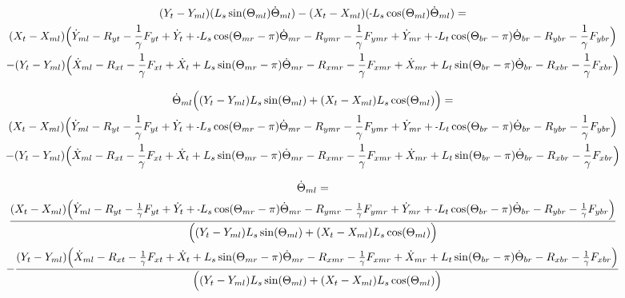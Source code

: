 \documentclass[11pt, landscape]{article}
\newcommand{\mn}{\scalebox{0.7}[1.0]{-}}
\begin{document}
\begin{multline}
(Y_{t } - Y_{ml})(L_{s}\sin(\Theta_{ml}) \dot{\Theta}_{ml}) - (X_{t } - X_{ml})(\mn L_{s}\cos(\Theta_{ml}) \dot{\Theta}_{ml}) = \\
(X_{t } - X_{ml}) \Big( \dot{Y}_{ml} - R_{yt} - \frac{1}{\gamma}F_{yt } + \dot{Y}_{t } + \mn L_{s}\cos(\Theta_{mr}-\pi)  \dot{\Theta}_{mr}
- R_{ymr} - \frac{1}{\gamma}F_{ymr} + \dot{Y}_{mr} + \mn L_{t}\cos(\Theta_{br}-\pi)  \dot{\Theta}_{br} - R_{ybr} - \frac{1}{\gamma}F_{ybr}\Big) \\
- (Y_{t } - Y_{ml})\Big( \dot{X}_{ml} - R_{xt } - \frac{1}{\gamma}F_{xt } + \dot{X}_{t } + L_{s}\sin(\Theta_{mr}-\pi)  \dot{\Theta}_{mr}
- R_{xmr} - \frac{1}{\gamma}F_{xmr} + \dot{X}_{mr} + L_{t}\sin(\Theta_{br}-\pi)  \dot{\Theta}_{br} - R_{xbr} - \frac{1}{\gamma}F_{xbr} \Big)
\end{multline}

\begin{multline}
\dot{\Theta}_{ml} \Big((Y_{t } - Y_{ml})L_{s}\sin(\Theta_{ml}) + (X_{t } - X_{ml})L_{s}\cos(\Theta_{ml}) \Big) = \\
(X_{t } - X_{ml}) \Big( \dot{Y}_{ml} - R_{yt} - \frac{1}{\gamma}F_{yt } + \dot{Y}_{t } + \mn L_{s}\cos(\Theta_{mr}-\pi)  \dot{\Theta}_{mr}
- R_{ymr} - \frac{1}{\gamma}F_{ymr} + \dot{Y}_{mr} + \mn L_{t}\cos(\Theta_{br}-\pi)  \dot{\Theta}_{br} - R_{ybr} - \frac{1}{\gamma}F_{ybr}\Big) \\
- (Y_{t } - Y_{ml})\Big( \dot{X}_{ml} - R_{xt } - \frac{1}{\gamma}F_{xt } + \dot{X}_{t } + L_{s}\sin(\Theta_{mr}-\pi)  \dot{\Theta}_{mr}
- R_{xmr} - \frac{1}{\gamma}F_{xmr} + \dot{X}_{mr} + L_{t}\sin(\Theta_{br}-\pi)  \dot{\Theta}_{br} - R_{xbr} - \frac{1}{\gamma}F_{xbr} \Big)
\end{multline}

\begin{multline}
\dot{\Theta}_{ml} = \\
\frac{(X_{t } - X_{ml}) \Big( \dot{Y}_{ml} - R_{yt} - \frac{1}{\gamma}F_{yt } + \dot{Y}_{t } + \mn L_{s}\cos(\Theta_{mr}-\pi)  \dot{\Theta}_{mr}
- R_{ymr} - \frac{1}{\gamma}F_{ymr} + \dot{Y}_{mr} + \mn L_{t}\cos(\Theta_{br}-\pi)  \dot{\Theta}_{br} - R_{ybr} - \frac{1}{\gamma}F_{ybr}\Big)}
{\Big((Y_{t } - Y_{ml})L_{s}\sin(\Theta_{ml}) + (X_{t } - X_{ml})L_{s}\cos(\Theta_{ml}) \Big)} \\
- \frac{(Y_{t } - Y_{ml})\Big( \dot{X}_{ml} - R_{xt } - \frac{1}{\gamma}F_{xt } + \dot{X}_{t } + L_{s}\sin(\Theta_{mr}-\pi)  \dot{\Theta}_{mr}
- R_{xmr} - \frac{1}{\gamma}F_{xmr} + \dot{X}_{mr} + L_{t}\sin(\Theta_{br}-\pi)  \dot{\Theta}_{br} - R_{xbr} - \frac{1}{\gamma}F_{xbr} \Big)}
{\Big((Y_{t } - Y_{ml})L_{s}\sin(\Theta_{ml}) + (X_{t } - X_{ml})L_{s}\cos(\Theta_{ml}) \Big)}
\end{multline}
\end{document}
